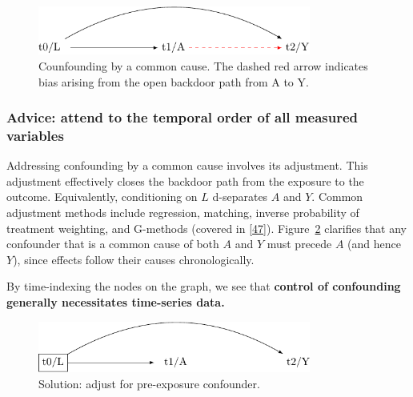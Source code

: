 \documentclass[
  singlecolumn]{article}
\begin{document}
\begin{figure}

{\centering \includegraphics[width=0.8\textwidth,height=\textheight]{causal-dags_files/figure-pdf/fig-dag-common-cause-1.pdf}

}

\caption{\label{fig-dag-common-cause}Counfounding by a common cause. The
dashed red arrow indicates bias arising from the open backdoor path from
A to Y.}

\end{figure}

\hypertarget{advice-attend-to-the-temporal-order-of-all-measured-variables}{%
\subsubsection{Advice: attend to the temporal order of all measured
variables}\label{advice-attend-to-the-temporal-order-of-all-measured-variables}}

Addressing confounding by a common cause involves its adjustment. This
adjustment effectively closes the backdoor path from the exposure to the
outcome. Equivalently, conditioning on \(L\) d-separates \(A\) and
\(Y\). Common adjustment methods include regression, matching, inverse
probability of treatment weighting, and G-methods (covered in
{[}\protect\hyperlink{ref-hernuxe1n2023a}{47}{]}).
Figure~\ref{fig-dag-common-cause-solution} clarifies that any confounder
that is a common cause of both \(A\) and \(Y\) must precede \(A\) (and
hence \(Y\)), since effects follow their causes chronologically.

By time-indexing the nodes on the graph, we see that \textbf{control of
confounding generally necessitates time-series data.}

\begin{figure}

{\centering \includegraphics[width=0.8\textwidth,height=\textheight]{causal-dags_files/figure-pdf/fig-dag-common-cause-solution-1.pdf}

}

\caption{\label{fig-dag-common-cause-solution}Solution: adjust for
pre-exposure confounder.}

\end{figure}
\end{document}
